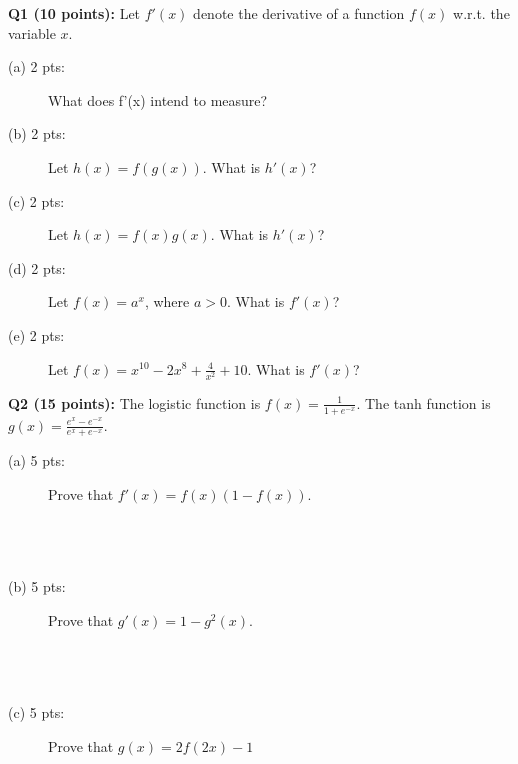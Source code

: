 \documentclass[11pt]{article}
\begin{document}
\vspace{0.4 in}
\hspace{-0.3in}
       {\bf Q1 (10 points):} Let $f'(x)$ denote the derivative of a
         function $f(x)$ w.r.t. the variable $x$.
\begin{description}
   \item [(a) 2 pts:] What does f'(x) intend to measure? \\
  
   \item [(b) 2 pts:] Let $h(x)=f(g(x))$. What is $h'(x)$? \\

   \item [(c) 2 pts:] Let $h(x)=f(x)g(x)$. What is $h'(x)$? \\

   \item [(d) 2 pts:] Let $f(x)=a^x$, where $a>0$. What is $f'(x)$? \\

   \item [(e) 2 pts:] Let $f(x)= x^{10}-2x^8 + \frac{4}{x^2} + 10$.
            What is $f'(x)$? \\
\end{description}


\vspace{0.4 in}
\hspace{-0.3in}
{\bf Q2 (15 points):} The logistic function is $f(x)=\frac{1}{1+e^{-x}}$.
       The tanh function is $g(x)=\frac{e^x - e^{-x}}{e^x +e^{-x}}$.
    \begin{description}
     \item [(a) 5 pts:] Prove that $f'(x)=f(x)(1-f(x))$. \\ \\ \\ \\
     \item [(b) 5 pts:] Prove that $g'(x)=1 - g^2(x)$. \\  \\ \\ \\  
     \item [(c) 5 pts:] Prove that $g(x) = 2f(2x)-1$  \\  \\ \\ \\
    \end{description}
    
\end{document}
